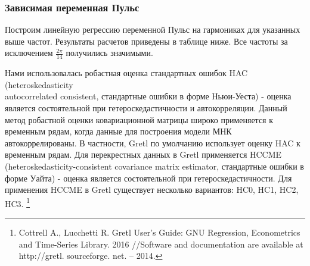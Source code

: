 \documentclass[a4paper,12pt]{article}
\begin{document}
\subsubsection{Зависимая переменная Пульс}
Построим линейную регрессию переменной Пульс на гармониках для указанных выше частот. Результаты расчетов приведены в таблице ниже. Все частоты за исключением $\frac{2 \pi}{14}$ получились значимыми.

Нами использовалась робастная оценка стандартных ошибок HAC (heteroskedasticity \\ autocorrelated consistent, стандартные ошибки в форме Ньюи-Уеста) - оценка является состоятельной при гетероскедастичности и автокорреляции. Данный метод робастной оценки ковариационной матрицы широко применяется к временным рядам, когда данные для построения модели МНК автокоррелированы. В частности, Gretl по умолчанию использует оценку HAC к временным рядам. Для перекрестных данных в Gretl применяется HCCME (heteroskedasticity-consistent covariance matrix estimator, стандартные ошибки в форме Уайта) - оценка является состоятельной при гетероскедастичности. Для применения HCCME в Gretl существует несколько вариантов: HC0, HC1, HC2, HC3. \footnote{Cottrell A., Lucchetti R. Gretl User’s Guide: GNU Regression, Econometrics and Time-Series Library. 2016 //Software and documentation are available at http://gretl. sourceforge. net. – 2014.}
\end{document}
